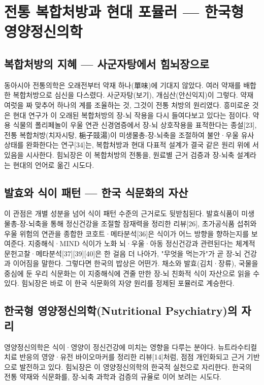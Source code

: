 \documentclass[12pt,oneside]{book}
\begin{document}
\section{전통 복합처방과 현대 포뮬러 — 한국형 영양정신의학}

\subsection{복합처방의 지혜 — 사군자탕에서 힘뇌장으로}

동아시아 전통의학은 오래전부터 약재 하나(單味)에 기대지 않았다. 여러 약재를 배합한 복합처방으로 심신을 다스렸다. 사군자탕(보기), 개심산(안신익지)이 그렇다. 약재 여럿을 짜 맞추어 하나의 계를 조율하는 것, 그것이 전통 처방의 원리였다. 흥미로운 것은 현대 연구가 이 오래된 복합처방의 장-뇌 작용을 다시 들여다보고 있다는 점이다. 약용 식물의 폴리페놀이 우울 연관 신경염증에서 장-뇌 상호작용을 표적한다는 종설[23], 전통 복합처방(치자시탕, 梔子豉湯)이 미생물총-장-뇌축을 조절하여 불안·우울 유사 상태를 완화한다는 연구[34]는, 복합처방과 현대 다표적 설계가 결국 같은 원리 위에 서 있음을 시사한다. 힘뇌장은 이 복합처방의 전통을, 원료별 근거 검증과 장-뇌축 설계라는 현대의 언어로 옮긴 시도다.

\subsection{발효와 식이 패턴 — 한국 식문화의 자산}

이 관점은 개별 성분을 넘어 식이 패턴 수준의 근거로도 뒷받침된다. 발효식품이 미생물총-장-뇌축을 통해 정신건강을 조절할 잠재력을 정리한 리뷰[26], 초가공식품 섭취와 우울 위험의 연관을 종합한 코호트·메타분석[36]은 식이가 어느 방향을 향하는지를 보여준다. 지중해식·MIND 식이가 노화 뇌·우울·아동 정신건강과 관련된다는 체계적 문헌고찰·메타분석[37][39][40]은 한 걸음 더 나아가, "무엇을 먹는가"가 곧 장-뇌 건강과 이어짐을 말한다. 그렇다면 한국의 밥상은 어떤가. 채소와 발효(김치·장류), 국물을 중심에 둔 우리 식문화는 이 지중해식에 견줄 만한 장-뇌 친화적 식이 자산으로 읽을 수 있다. 힘뇌장은 바로 이 한국 식문화의 자양 원리를 정제된 포뮬러로 계승한다.

\subsection{한국형 영양정신의학(Nutritional Psychiatry)의 자리}

영양정신의학은 식이·영양이 정신건강에 미치는 영향을 다루는 분야다. 뉴트라수티컬 치료 반응의 영양·유전 바이오마커를 정리한 리뷰[14]처럼, 점점 개인화되고 근거 기반으로 발전하고 있다. 힘뇌장은 이 영양정신의학의 한국적 실천으로 자리한다. 한국의 전통 약재와 식문화를, 장-뇌축 과학과 검증의 규율로 이어 보려는 시도다.
\end{document}
